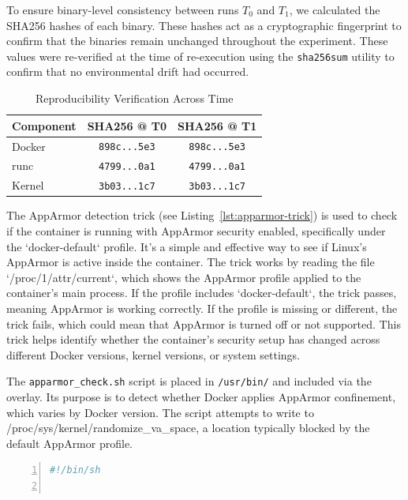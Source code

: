 \documentclass[12pt]{report}
\begin{document}
\begin{doublespace}
To ensure binary-level consistency between runs \texttt{\( T_0 \)} and \texttt{\( T_1 \)}, we calculated the SHA256 hashes of each binary. These hashes act as a cryptographic fingerprint to confirm that the binaries remain unchanged throughout the experiment. These values were re-verified at the time of re-execution using the \texttt{sha256sum} utility to confirm that no environmental drift had occurred.

\begin{table}[H]
\centering
\caption{Reproducibility Verification Across Time}
\begin{tabular}{|l|c|c|}
\hline
\textbf{Component} & \textbf{SHA256 @ T0} & \textbf{SHA256 @ T1} \\
\hline
Docker & \texttt{898c...5e3} & \texttt{898c...5e3} \\
runc & \texttt{4799...0a1} & \texttt{4799...0a1} \\
Kernel & \texttt{3b03...1c7} & \texttt{3b03...1c7} \\
\hline
\end{tabular}
\end{table}


The AppArmor detection trick (see Listing~\ref{lst:apparmor-trick}) is used to check if the container is running with AppArmor security enabled, specifically under the `docker-default` profile. It’s a simple and effective way to see if Linux’s AppArmor is active inside the container. The trick works by reading the file `/proc/1/attr/current`, which shows the AppArmor profile applied to the container’s main process. If the profile includes `docker-default`, the trick passes, meaning AppArmor is working correctly. If the profile is missing or different, the trick fails, which could mean that AppArmor is turned off or not supported. This trick helps identify whether the container's security setup has changed across different Docker versions, kernel versions, or system settings.

The \texttt{apparmor\_check.sh} script is placed in \texttt{/usr/bin/} and included via the overlay. Its purpose is to detect whether Docker applies AppArmor confinement, which varies by Docker version. The script attempts to write to /proc/sys/kernel/randomize\_va\_space, a location typically blocked by the default AppArmor profile.

\begin{lstlisting}[language=bash, caption={AppArmor Enforcement Trick Script}, label={lst:apparmor-trick}, numbers=left, numberstyle=\tiny, stepnumber=1, breaklines=true, frame=single, backgroundcolor=\color{gray!10}, basicstyle=\ttfamily\footnotesize, showspaces=false, showstringspaces=false]
#!/bin/sh


\end{lstlisting}
\end{doublespace}
\end{document}
